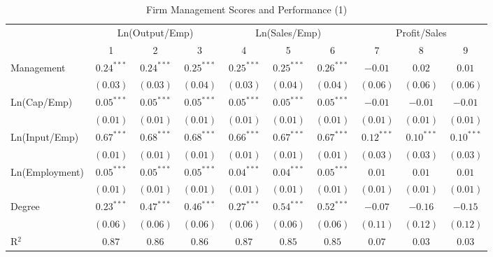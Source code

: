 \documentclass{article}
\begin{document}
\begin{table}
\caption{Firm Management Scores and Performance (1)}
\begin{center}
\begin{small}
\begin{tabular}{l c c c c c c c c c}
\hline
 & \multicolumn{3}{c}{Ln(Output/Emp)} & \multicolumn{3}{c}{Ln(Sales/Emp)} & \multicolumn{3}{c}{Profit/Sales} \\
\cline{2-4} \cline{5-7} \cline{8-10}
 & 1 & 2 & 3 & 4 & 5 & 6 & 7 & 8 & 9 \\
\hline
Management     & $0.24^{***}$ & $0.24^{***}$ & $0.25^{***}$ & $0.25^{***}$ & $0.25^{***}$ & $0.26^{***}$ & $-0.01$      & $0.02$       & $0.01$       \\
               & $(0.03)$     & $(0.03)$     & $(0.04)$     & $(0.03)$     & $(0.04)$     & $(0.04)$     & $(0.06)$     & $(0.06)$     & $(0.06)$     \\
Ln(Cap/Emp)    & $0.05^{***}$ & $0.05^{***}$ & $0.05^{***}$ & $0.05^{***}$ & $0.05^{***}$ & $0.05^{***}$ & $-0.01$      & $-0.01$      & $-0.01$      \\
               & $(0.01)$     & $(0.01)$     & $(0.01)$     & $(0.01)$     & $(0.01)$     & $(0.01)$     & $(0.01)$     & $(0.01)$     & $(0.01)$     \\
Ln(Input/Emp)  & $0.67^{***}$ & $0.68^{***}$ & $0.68^{***}$ & $0.66^{***}$ & $0.67^{***}$ & $0.67^{***}$ & $0.12^{***}$ & $0.10^{***}$ & $0.10^{***}$ \\
               & $(0.01)$     & $(0.01)$     & $(0.01)$     & $(0.01)$     & $(0.01)$     & $(0.01)$     & $(0.03)$     & $(0.03)$     & $(0.03)$     \\
Ln(Employment) & $0.05^{***}$ & $0.05^{***}$ & $0.05^{***}$ & $0.04^{***}$ & $0.04^{***}$ & $0.05^{***}$ & $0.01$       & $0.01$       & $0.01$       \\
               & $(0.01)$     & $(0.01)$     & $(0.01)$     & $(0.01)$     & $(0.01)$     & $(0.01)$     & $(0.01)$     & $(0.01)$     & $(0.01)$     \\
Degree         & $0.23^{***}$ & $0.47^{***}$ & $0.46^{***}$ & $0.27^{***}$ & $0.54^{***}$ & $0.52^{***}$ & $-0.07$      & $-0.16$      & $-0.15$      \\
               & $(0.06)$     & $(0.06)$     & $(0.06)$     & $(0.06)$     & $(0.06)$     & $(0.06)$     & $(0.11)$     & $(0.12)$     & $(0.12)$     \\
\hline
R$^2$          & $0.87$       & $0.86$       & $0.86$       & $0.87$       & $0.85$       & $0.85$       & $0.07$       & $0.03$       & $0.03$       \\

\end{tabular}
\end{small}
\end{center}
\end{table}
\end{document}
